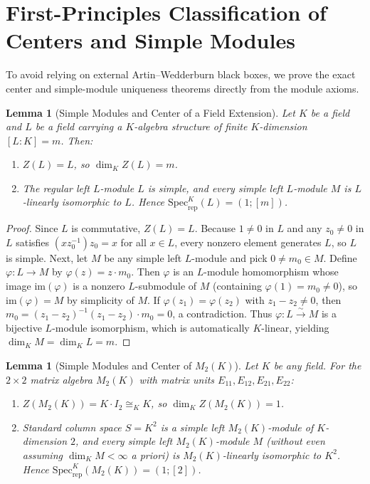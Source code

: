 \documentclass[11pt,a4paper]{article}
\theoremstyle{plain}
\newtheorem{lemma}[theorem]{Lemma}
\theoremstyle{definition}
\newcommand{\Specrep}{\mathrm{Spec}_{\mathrm{rep}}}
\newcommand{\Mat}{M}
\begin{document}
\section{First-Principles Classification of Centers and Simple Modules}

To avoid relying on external Artin--Wedderburn black boxes, we prove the exact center and simple-module uniqueness theorems directly from the module axioms.

\begin{lemma}[Simple Modules and Center of a Field Extension]\label{lem:field-mod}
Let $K$ be a field and $L$ be a field carrying a $K$-algebra structure of finite $K$-dimension $[L:K] = m$. Then:
\begin{enumerate}
  \item $Z(L) = L$, so $\dim_K Z(L) = m$.
  \item The regular left $L$-module $L$ is simple, and \emph{every} simple left $L$-module $M$ is $L$-linearly isomorphic to $L$. Hence $\Specrep^K(L) = (1;[m])$.
\end{enumerate}
\end{lemma}

\begin{proof}
Since $L$ is commutative, $Z(L)=L$. Because $1 \neq 0$ in $L$ and any $z_0 \neq 0$ in $L$ satisfies $(x z_0^{-1}) z_0 = x$ for all $x \in L$, every nonzero element generates $L$, so $L$ is simple. Next, let $M$ be any simple left $L$-module and pick $0 \neq m_0 \in M$. Define $\varphi : L \to M$ by $\varphi(z) = z \cdot m_0$. Then $\varphi$ is an $L$-module homomorphism whose image $\mathrm{im}(\varphi)$ is a nonzero $L$-submodule of $M$ (containing $\varphi(1) = m_0 \neq 0$), so $\mathrm{im}(\varphi) = M$ by simplicity of $M$. If $\varphi(z_1) = \varphi(z_2)$ with $z_1 - z_2 \neq 0$, then $m_0 = (z_1-z_2)^{-1}(z_1-z_2)\cdot m_0 = 0$, a contradiction. Thus $\varphi : L \xrightarrow{\sim} M$ is a bijective $L$-module isomorphism, which is automatically $K$-linear, yielding $\dim_K M = \dim_K L = m$.
\end{proof}

\begin{lemma}[Simple Modules and Center of $\Mat_2(K)$]\label{lem:mat2}
Let $K$ be any field. For the $2 \times 2$ matrix algebra $\Mat_2(K)$ with matrix units $E_{11}, E_{12}, E_{21}, E_{22}$:
\begin{enumerate}
  \item $Z(\Mat_2(K)) = K \cdot I_2 \cong_K K$, so $\dim_K Z(\Mat_2(K)) = 1$.
  \item Standard column space $S = K^2$ is a simple left $\Mat_2(K)$-module of $K$-dimension $2$, and \emph{every} simple left $\Mat_2(K)$-module $M$ (without even assuming $\dim_K M < \infty$ a priori) is $\Mat_2(K)$-linearly isomorphic to $K^2$. Hence $\Specrep^K(\Mat_2(K)) = (1;[2])$.
\end{enumerate}
\end{lemma}
\end{document}
